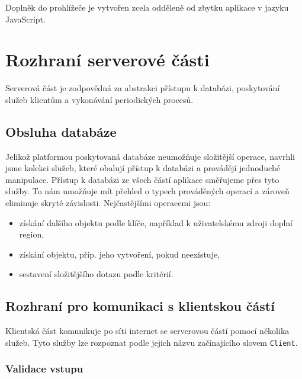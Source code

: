 \bigskip

Doplněk do prohlížeče je vytvořen zcela odděleně od zbytku aplikace v jazyku JavaScript.

\section{Rozhraní serverové části}

Serverová část je zodpovědná za abstrakci přístupu k databázi, poskytování služeb klientům a vykonávání periodických procesů.

\subsection{Obsluha databáze}
Jelikož platformou poskytovaná databáze neumožňuje složitější operace, navrhli jsme kolekci služeb, které obalují přístup k databázi a provádějí jednoduché manipulace.
Přístup k databázi ze všech částí aplikace směřujeme přes tyto služby.
To nám umožňuje mít přehled o typech prováděných operací a zároveň eliminuje skryté závislosti.
Nejčastějšími operacemi jsou:
\begin{itemize}
	\item získání dalšího objektu podle klíče, například k uživatelskému zdroji doplní region,
	\item získání objektu, příp. jeho vytvoření, pokud neexistuje,
	\item sestavení složitějšího dotazu podle kritérií.
\end{itemize}

\subsection{Rozhraní pro komunikaci s klientskou částí}

Klientská část komunikuje po síti internet se serverovou částí pomocí několika služeb.
Tyto služby lze rozpoznat podle jejich názvu začínajícího slovem \verb|Client|.

\subsubsection{Validace vstupu}

